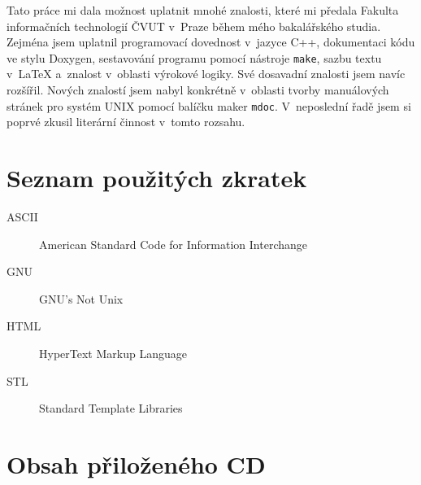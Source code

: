 \documentclass[thesis=B,czech,hidelinks]{thesis}[2012/06/26]
\begin{document}
%
%
%

\begin{conclusion}
Tato práce mi dala možnost uplatnit mnohé znalosti, které mi předala Fakulta informačních technologií ČVUT v~Praze během mého bakalářského studia. Zejména jsem uplatnil programovací dovednost v~jazyce C++, dokumentaci kódu ve stylu Doxygen, sestavování programu pomocí nástroje \texttt{make}, sazbu textu v~\LaTeX{} a~znalost v~oblasti výrokové logiky. Své dosavadní znalosti jsem navíc rozšířil. Nových znalostí jsem nabyl konkrétně v~oblasti tvorby manuálových stránek pro systém UNIX pomocí balíčku maker \texttt{mdoc}. V~neposlední řadě jsem si poprvé zkusil literární činnost v~tomto rozsahu.
\end{conclusion}

%
%
%




\appendix

%
%
%

\chapter{Seznam použitých zkratek}

\begin{description}
	\item[ASCII] American Standard Code for Information Interchange
	\item[GNU] GNU's Not Unix
	\item[HTML] HyperText Markup Language
	\item[STL] Standard Template Libraries
\end{description}

%
%
%

\chapter{Obsah přiloženého CD}

\begin{figure}
\end{figure}
\end{document}
